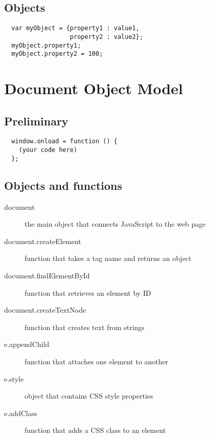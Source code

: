 \documentclass[letterpage,foldmark,10pt]{leaflet}
\begin{document}
\subsection{Objects}
\begin{verbatim}
  var myObject = {property1 : value1, 
                  property2 : value2};
  myObject.property1;
  myObject.property2 = 100;
\end{verbatim}
\section{Document Object Model}
\subsection{Preliminary}
\begin{verbatim}
  window.onload = function () {
    (your code here)
  };
\end{verbatim}
\subsection{Objects and functions}
\begin{description}
  \item [document] the main object that connects JavaScript to the web page
  \item [document.createElement] function that takes a tag name and returns an object
  \item [document.findElementById] function that retrieves an element by ID
  \item [document.createTextNode] function that creates text from strings
  \item [e.appendChild] function that attaches one element to another
  \item [e.style] object that contains CSS style properties
  \item [e.addClass] function that adds a CSS class to an element
\end{description}
\end{document}
